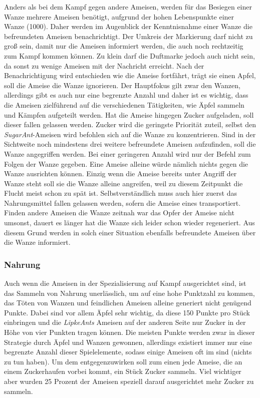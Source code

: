 Anders als bei dem Kampf gegen andere Ameisen, werden für das Besiegen einer Wanze mehrere Ameisen benötigt, aufgrund der hohen Lebenspunkte einer Wanze (1000). Daher werden im Augenblick der Kenntnisnahme einer Wanze die befreundeten Ameisen benachrichtigt. Der Umkreis der Markierung darf nicht zu groß sein, damit nur die Ameisen informiert werden, die auch noch rechtzeitig zum Kampf kommen können. Zu klein darf die Duftmarke jedoch auch nicht sein, da sonst zu wenige Ameisen mit der Nachricht erreicht. Nach der Benachrichtigung wird entschieden wie die Ameise fortfährt, trägt sie einen Apfel, soll die Ameise die Wanze ignorieren. Der Hauptfokus gilt zwar den Wanzen, allerdings gibt es auch nur eine begrenzte Anzahl und daher ist es wichtig, dass die Ameisen zielführend auf die verschiedenen Tätigkeiten, wie Äpfel sammeln und Kämpfen aufgeteilt werden. Hat die Ameise hingegen Zucker aufgeladen, soll dieser fallen gelassen werden. Zucker wird die geringste Priorität zuteil, selbst den \textit{SugarAnt}-Ameisen wird befohlen sich auf die Wanze zu konzentrieren. Sind in der Sichtweite noch mindestens drei weitere befreundete Ameisen aufzufinden, soll die Wanze angegriffen werden. Bei einer geringeren Anzahl wird nur der Befehl zum Folgen der Wanze gegeben. Eine Ameise alleine würde nämlich nichts gegen die Wanze ausrichten können. Einzig wenn die Ameise bereits unter Angriff der Wanze steht soll sie die Wanze alleine angreifen, weil zu diesem Zeitpunkt die Flucht meist schon zu spät ist. Selbstverständlich muss auch hier zuerst das Nahrungsmittel fallen gelassen werden, sofern die Ameise eines transportiert. Finden andere Ameisen die Wanze zeitnah war das Opfer der Ameise nicht umsonst, dauert es länger hat die Wanze sich leider schon wieder regeneriert. Aus diesem Grund werden in solch einer Situation ebenfalls befreundete Ameisen über die Wanze informiert.

\subsubsection{Nahrung} \label{sssec:food}
Auch wenn die Ameisen in der Spezialisierung auf Kampf ausgerichtet sind, ist das Sammeln von Nahrung unerlässlich, um auf eine hohe Punktzahl zu kommen, das Töten von Wanzen und feindlichen Ameisen alleine generiert nicht genügend Punkte. Dabei sind vor allem Äpfel sehr wichtig, da diese 150 Punkte pro Stück einbringen und die \textit{LipkeAnts} Ameisen auf der anderen Seite nur Zucker in der Höhe von vier Punkten tragen können. Die meisten Punkte werden zwar in dieser Strategie durch Äpfel und Wanzen gewonnen, allerdings existiert immer nur eine begrenzte Anzahl dieser Spielelemente, sodass einige Ameisen oft im  sind (nichts zu tun haben). Um dem entgegenzuwirken soll zum einen jede Ameise, die an einem Zuckerhaufen vorbei kommt, ein Stück Zucker sammeln. Viel wichtiger aber wurden 25 Prozent der Ameisen speziell darauf ausgerichtet mehr Zucker zu sammeln.

